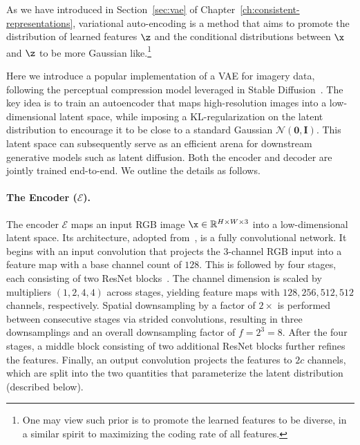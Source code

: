 \documentclass[../../book-main.tex]{subfiles}
\begin{document}

\label{sec:VAE-implement}

As we have introduced in Section~\ref{sec:vae} of
Chapter~\ref{ch:consistent-representations}, variational
auto-encoding is a method that aims to promote the distribution of
learned features $\z$ and the conditional distributions between $\x$
and $\z$ to be more Gaussian like.\footnote{One may view such prior
is to promote the learned features to be diverse, in a similar spirit
to maximizing the coding rate of all features.}

Here we introduce a popular implementation of a VAE for imagery data,
following the perceptual compression model leveraged in Stable
Diffusion~\citep{rombach2022high}. The key idea is to train an
autoencoder that maps high-resolution images into a low-dimensional
latent space, while imposing a KL-regularization on the latent
distribution to encourage it to be close to a standard Gaussian
$\mathcal{N}(\boldsymbol{0}, \boldsymbol{I})$. This latent space can
subsequently serve as an efficient arena for downstream generative
models such as latent diffusion. Both the encoder and decoder are
jointly trained end-to-end. We outline the details as follows.

\paragraph{The Encoder ($\mathcal{E}$).}
The encoder $\mathcal{E}$ maps an input RGB image $\x \in
\mathbb{R}^{H \times W \times 3}$ into a low-dimensional latent
space. Its architecture, adopted from~\citep{esser2021taming}, is a
fully convolutional network. It begins with an input convolution that
projects the 3-channel RGB input into a feature map with a base
channel count of $128$. This is followed by four stages, each
consisting of two ResNet blocks~\citep{he2016deep}. The channel
dimension is scaled by multipliers $(1, 2, 4, 4)$ across stages,
yielding feature maps with $128, 256, 512, 512$ channels,
respectively. Spatial downsampling by a factor of $2\times$ is
performed between consecutive stages via strided convolutions,
resulting in three downsamplings and an overall downsampling factor
of $f = 2^3 = 8$. After the four stages, a middle block consisting of
two additional ResNet blocks further refines the features. Finally,
an output convolution projects the features to $2c$ channels, which
are split into the two quantities that parameterize the latent
distribution (described below).
\end{document}
